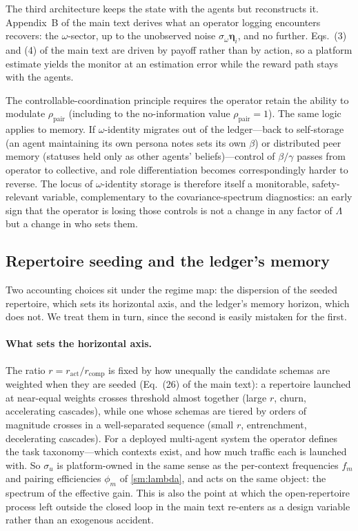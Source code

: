 \documentclass[
  aps,prx,
  preprint,
  superscriptaddress,
  nofootinbib
]{revtex4-2}
\newcommand{\rhopair}{\rho_{\mathrm{pair}}}
\newcommand{\sidn}{\sigma_{\omega}}
\newcommand{\ract}{r_{\mathrm{act}}}
\newcommand{\rcomp}{r_{\mathrm{comp}}}
\begin{document}
The third architecture keeps the state with the agents but reconstructs it. Appendix~B of the main text derives what an operator logging encounters recovers: the $\omega$-sector, up to the unobserved noise $\sidn\bm\eta_i$, and no further. Eqs.~(3) and (4) of the main text are driven by payoff rather than by action, so a platform estimate yields the monitor at an estimation error while the reward path stays with the agents.

The controllable-coordination principle requires the operator retain the ability to modulate $\rhopair$ (including to the no-information value $\rhopair=1$). The same logic applies to memory. If $\omega$-identity migrates out of the ledger---back to self-storage (an agent maintaining its own persona notes sets its own $\beta$) or distributed peer memory (statuses held only as other agents' beliefs)---control of $\beta/\gamma$ passes from operator to collective, and role differentiation becomes correspondingly harder to reverse. The locus of $\omega$-identity storage is therefore itself a monitorable, safety-relevant variable, complementary to the covariance-spectrum diagnostics: an early sign that the operator is losing those controls is not a change in any factor of $\Lambda$ but a change in who sets them.

\subsection{Repertoire seeding and the ledger's memory}\label{sm:inertia}

\noindent Two accounting choices sit under the regime map: the dispersion of the seeded repertoire, which sets its horizontal axis, and the ledger's memory horizon, which does not. We treat them in turn, since the second is easily mistaken for the first.

\paragraph{What sets the horizontal axis.} The ratio $r=\ract/\rcomp$ is fixed by how unequally the candidate schemas are weighted when they are seeded (Eq.~(26) of the main text): a repertoire launched at near-equal weights crosses threshold almost together (large $r$, churn, accelerating cascades), while one whose schemas are tiered by orders of magnitude crosses in a well-separated sequence (small $r$, entrenchment, decelerating cascades). For a deployed multi-agent system the operator defines the task taxonomy---which contexts exist, and how much traffic each is launched with. So $\sigma_u$ is platform-owned in the same sense as the per-context frequencies $f_m$ and pairing efficiencies $\phi_m$ of \cref{sm:lambda}, and acts on the same object: the spectrum of the effective gain. This is also the point at which the open-repertoire process left outside the closed loop in the main text re-enters as a design variable rather than an exogenous accident.
\end{document}
